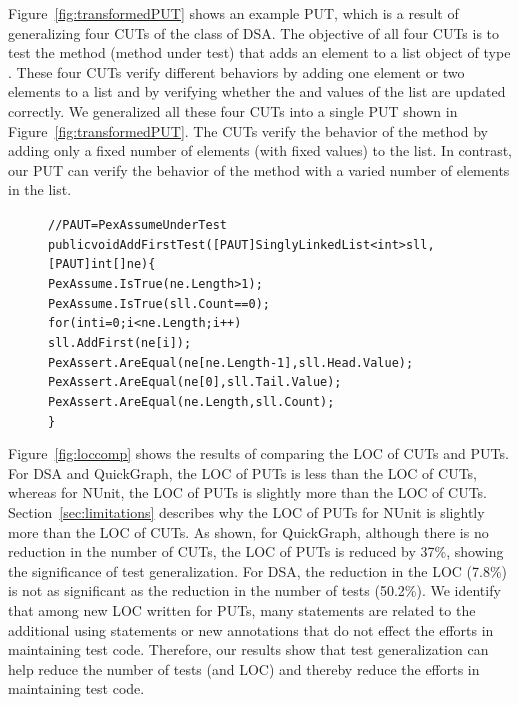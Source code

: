 Figure~\ref{fig:transformedPUT} shows an example PUT, which is a result of generalizing four CUTs of the  class of DSA. The objective of all four CUTs is to test the  method (method under test) that adds an element to a list object of type . These four CUTs verify different behaviors by adding one element or two elements to a list and by verifying whether the  and  values of the list are updated correctly. We generalized all these four CUTs into a single PUT shown in Figure~\ref{fig:transformedPUT}. The CUTs verify the behavior of the  method by adding only a fixed number of elements (with fixed values) to the list. In contrast, our PUT can verify the behavior of the  method with a varied number of elements in the list. 

\begin{figure}[t]
\begin{CodeOut}
\begin{alltt}
//PAUT = PexAssumeUnderTest
public void AddFirstTest([PAUT]SinglyLinkedList<int> sll, 
\hspace*{0.6in}[PAUT]int[] ne) \{            
\hspace*{0.2in}PexAssume.IsTrue(ne.Length > 1);
\hspace*{0.2in}PexAssume.IsTrue(sll.Count == 0);
\hspace*{0.2in}for (int i = 0; i < ne.Length; i++)
\hspace*{0.4in}sll.AddFirst(ne[i]);
\hspace*{0.2in}PexAssert.AreEqual(ne[ne.Length - 1], sll.Head.Value);            
\hspace*{0.2in}PexAssert.AreEqual(ne[0], sll.Tail.Value);
\hspace*{0.2in}PexAssert.AreEqual(ne.Length, sll.Count);
\}
\end{alltt}
\end{CodeOut}\vspace*{-4ex}
 \vspace*{-3ex}
\end{figure}

Figure~\ref{fig:loccomp} shows the results of comparing the LOC of CUTs and PUTs. For DSA and QuickGraph, the LOC of PUTs is less than the LOC of CUTs, whereas for NUnit, the LOC of PUTs is slightly more than the LOC of CUTs. Section~\ref{sec:limitations} describes why the LOC of PUTs for NUnit is slightly more than the LOC of CUTs. As shown, for QuickGraph, although there is no reduction in the number of CUTs, the LOC of PUTs is reduced by 37\%, showing the significance of test generalization. For DSA, the reduction in the LOC (7.8\%) is not as significant as the reduction in the number of tests (50.2\%). We identify that among new LOC written for PUTs, many statements are related to the additional using statements or new annotations that do not effect the efforts in maintaining test code. Therefore, our results show that test generalization can help reduce the number of tests (and LOC) and thereby reduce the efforts in maintaining test code.

